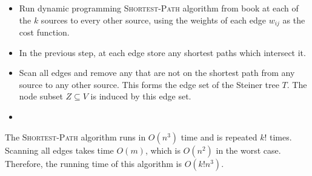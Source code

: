 \documentclass[12pt]{article}
\begin{document}
\begin{itemize}
\item
Run dynamic programming \textsc{Shortest-Path} algorithm from book
at each of the $k$ sources to every other source, using the weights
of each edge $w_{ij}$ as the cost function.
\item
In the previous step, at each edge store any shortest paths which
intersect it.
\item
Scan all edges and remove any that are not on the shortest path from
any source to any other source. This forms the edge set of the Steiner tree
$T$. The node subset $Z \subseteq V$ is induced by this edge set.
\item

\end{itemize}

The \textsc{Shortest-Path} algorithm runs in $O(n^3)$ time and is
repeated $k!$ times. Scanning all edges takes time $O(m)$, which is
$O(n^2)$ in the worst case. Therefore, the running time of this algorithm
is $O(k!n^3)$.
\end{document}
